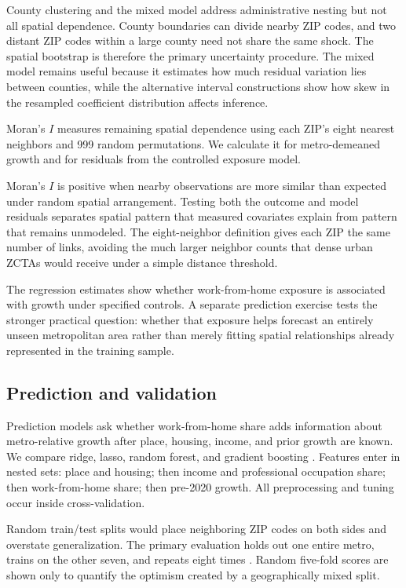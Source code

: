 \documentclass[11pt]{article}
\begin{document}
County clustering and the mixed model address administrative nesting but not all spatial dependence. County boundaries can divide
nearby ZIP codes, and two distant ZIP codes within a large county need not share the same shock. The spatial bootstrap is therefore
the primary uncertainty procedure. The mixed model remains useful because it estimates how much residual variation lies between
counties, while the alternative interval constructions show how skew in the resampled coefficient distribution affects inference.

Moran's $I$ measures remaining spatial dependence using each ZIP's eight nearest neighbors and 999 random permutations. We
calculate it for metro-demeaned growth and for residuals from the controlled exposure model.

Moran's $I$ is positive when nearby observations are more similar than expected under random spatial arrangement. Testing both the
outcome and model residuals separates spatial pattern that measured covariates explain from pattern that remains unmodeled. The
eight-neighbor definition gives each ZIP the same number of links, avoiding the much larger neighbor counts that dense urban ZCTAs
would receive under a simple distance threshold.

The regression estimates show whether work-from-home exposure is associated with growth under specified controls. A separate
prediction exercise tests the stronger practical question: whether that exposure helps forecast an entirely unseen metropolitan
area rather than merely fitting spatial relationships already represented in the training sample.

\subsection{Prediction and validation}

Prediction models ask whether work-from-home share adds information about metro-relative growth after place, housing, income, and
prior growth are known. We compare ridge, lasso, random forest, and gradient boosting \cite{breiman2,sklearn}. Features enter in
nested sets: place and housing; then income and professional occupation share; then work-from-home share; then pre-2020 growth.
All preprocessing and tuning occur inside cross-validation.

Random train/test splits would place neighboring ZIP codes on both sides and overstate generalization. The primary evaluation
holds out one entire metro, trains on the other seven, and repeats eight times \cite{roberts}. Random five-fold scores are shown
only to quantify the optimism created by a geographically mixed split.
\end{document}
